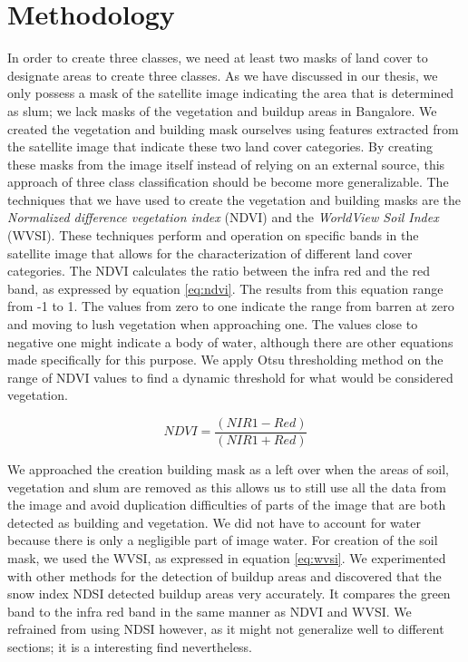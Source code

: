 \section{Methodology}
In order to create three classes, we need at least two masks of land cover to designate areas to create three classes. As we have discussed in our thesis, we only possess a mask of the satellite image indicating the area that is determined as slum; we lack masks of the vegetation and buildup areas in Bangalore. We created the vegetation and building mask ourselves using features extracted from the satellite image that indicate these two land cover categories. By creating these masks from the image itself instead of relying on an external source, this approach of three class classification should be become more generalizable. The techniques that we have used to create the vegetation and building masks are the \textit{Normalized difference vegetation index} (NDVI) and the \textit{WorldView Soil Index} (WVSI). These techniques perform and operation on specific bands in the satellite image that allows for the characterization of different land cover categories. The NDVI calculates the ratio between the infra red and the red band, as expressed by equation \ref{eq:ndvi}. The results from this equation range from -1 to 1. The values from zero to one indicate the range from barren at zero and moving to lush vegetation when approaching one. The values close to negative one might indicate a body of water, although there are other equations made specifically for this purpose. We apply Otsu thresholding method on the range of NDVI values to find a dynamic threshold for what would be considered vegetation.

\begin{equation}
\label{eq:ndvi}
NDVI = \frac{(NIR1 - Red)}{(NIR1 + Red)}
\end{equation}

We approached the creation building mask as a left over when the areas of soil, vegetation and slum are removed as this allows us to still use all the data from the image and avoid duplication difficulties of parts of the image that are both detected as building and vegetation. We did not have to account for water because there is only a negligible part of image water. For creation of the soil mask, we used the WVSI, as expressed in equation \ref{eq:wvsi}. We experimented with other methods for the detection of buildup areas and discovered that the snow index NDSI detected buildup areas very accurately. It compares the green band to the infra red band in the same manner as NDVI and WVSI. We refrained from using NDSI however, as it might not generalize well to different sections; it is a interesting find nevertheless.

